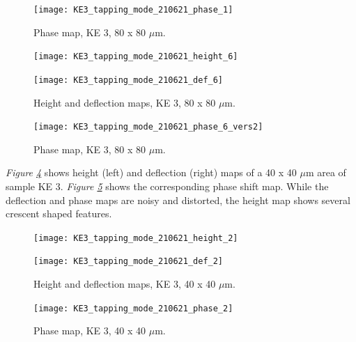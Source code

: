 \begin{figure}[H]
\centering
  \texttt{[image: KE3\_tapping\_mode\_210621\_phase\_1]}
\caption[Phase map, KE 3]{Phase map, KE 3, 80 x 80 $\mu$m.}
\label{fig:afm_ke3_phase_1}
\end{figure}


\begin{figure}[H]
\centering
\begin{minipage}{.45\textwidth}
  \centering
  \texttt{[image: KE3\_tapping\_mode\_210621\_height\_6]}
\end{minipage}
\begin{minipage}{.45\textwidth}
  \centering
  \texttt{[image: KE3\_tapping\_mode\_210621\_def\_6]}
\end{minipage}
\caption[Height and deflection maps, KE 3]{Height and deflection maps, KE 3, 80 x 80 $\mu$m.}
\label{fig:afm_ke3_height_def_2}
\end{figure}

\begin{figure}[H]
\centering
  \texttt{[image: KE3\_tapping\_mode\_210621\_phase\_6\_vers2]}
\caption[Phase map, KE 3]{Phase map, KE 3, 80 x 80 $\mu$m.}
\label{fig:afm_ke3_phase_2}
\end{figure}


\textit{Figure \ref{fig:afm_ke3_height_def_3}} shows height (left) and deflection (right) maps of a 40 x 40 $\mu$m area of sample KE 3. \textit{Figure \ref{fig:afm_ke3_phase_3}} shows the corresponding phase shift map. While the deflection and phase maps are noisy and distorted, the height map shows several crescent shaped features.


\begin{figure}[H]
\centering
\begin{minipage}{.45\textwidth}
  \centering
  \texttt{[image: KE3\_tapping\_mode\_210621\_height\_2]}
\end{minipage}
\begin{minipage}{.45\textwidth}
  \centering
  \texttt{[image: KE3\_tapping\_mode\_210621\_def\_2]}
\end{minipage}
\caption[Height and deflection maps, KE 3]{Height and deflection maps, KE 3, 40 x 40 $\mu$m.}
\label{fig:afm_ke3_height_def_3}
\end{figure}

\begin{figure}[H]
\centering
  \texttt{[image: KE3\_tapping\_mode\_210621\_phase\_2]}
\caption[Phase map, KE 3]{Phase map, KE 3, 40 x 40 $\mu$m.}
\label{fig:afm_ke3_phase_3}
\end{figure}

